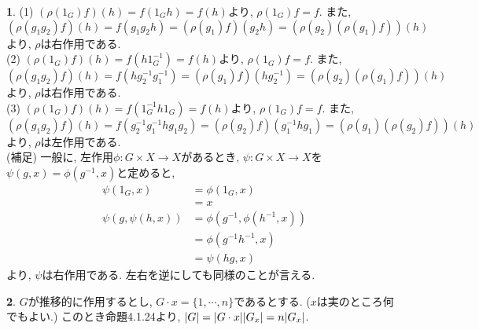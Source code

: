 \documentclass{article}
\theoremstyle{definition}
\newtheorem{ans}{}
\numberwithin{ans}{subsection}
\DeclarePairedDelimiter{\abs}{\lvert}{\rvert}
\begin{document}
\begin{ans}
  (1) $(\rho(1_G)f)(h) = f(1_Gh) = f(h)$より, $\rho(1_G)f = f$.
  また, $(\rho(g_1g_2)f)(h) = f(g_1g_2h) = (\rho(g_1)f)(g_2h) = (\rho(g_2)(\rho(g_1)f))(h)$
  より, $\rho$は右作用である.\\
  (2) $(\rho(1_G)f)(h) = f(h1_G^{-1}) = f(h)$より, $\rho(1_G)f = f$.
  また, $(\rho(g_1g_2)f)(h) = f(hg_2^{-1}g_1^{-1}) = (\rho(g_1)f)(hg_2^{-1}) = (\rho(g_2)(\rho(g_1)f))(h)$
  より, $\rho$は右作用である.\\
  (3) $(\rho(1_G)f)(h) = f(1_G^{-1}h1_G) = f(h)$より, $\rho(1_G)f = f$.
  また, $(\rho(g_1g_2)f)(h) = f(g_2^{-1}g_1^{-1}hg_1g_2) = (\rho(g_2)f)(g_1^{-1}hg_1) = (\rho(g_1)(\rho(g_2)f))(h)$
  より, $\rho$は左作用である.\\
  (補足) 一般に, 左作用$\phi: G \times X \rightarrow X$があるとき,
  $\psi: G \times X \rightarrow X$を$\psi(g, x) = \phi(g^{-1}, x)$と定めると,
  \begin{align*}
    \psi(1_G, x) &= \phi(1_G, x) \\
    &= x \\
    \psi(g, \psi(h, x)) &= \phi(g^{-1}, \phi(h^{-1}, x)) \\
    &= \phi(g^{-1}h^{-1}, x) \\
    &= \psi(hg, x)
  \end{align*}
  より, $\psi$は右作用である. 左右を逆にしても同様のことが言える.
\end{ans}

\begin{ans}
  $G$が推移的に作用するとし, $G \cdot x = \{1, \cdots , n\}$であるとする. ($x$は実のところ何でもよい.)
  このとき命題4.1.24より, $\abs{G} = \abs{G \cdot x}\abs{G_x} = n\abs{G_x}$.
\end{ans}
\end{document}
